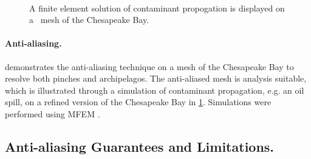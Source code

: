 \begin{figure}
\centering
{}
\\
\caption{A finite element solution of contaminant propogation is displayed on a \briancode\  mesh of the Chesapeake Bay.}
\label{fig:fea}
\end{figure}

\paragraph{Anti-aliasing.}
 demonstrates the anti-aliasing technique on a mesh of the Chesapeake Bay to resolve both pinches and archipelagos.
The anti-aliased mesh is analysis suitable, which is illustrated through a simulation of contaminant propagation, e.g. an oil spill, on a refined version of the Chesapeake Bay in \cref{fig:fea}.
Simulations were performed using MFEM \cite{mfem,mfem-web}.

%
%


\subsection{Anti-aliasing Guarantees and Limitations.}

